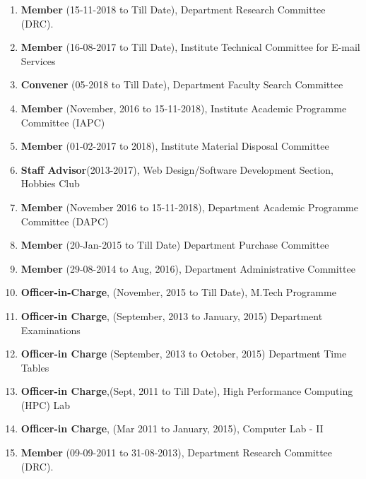 \begin{enumerate}

\item
\textbf{Member} (15-11-2018 to Till Date), Department Research Committee (DRC).

\item
\textbf{Member} (16-08-2017 to Till Date), Institute Technical Committee for E-mail Services

\item
\textbf{Convener} (05-2018 to Till Date), Department Faculty Search Committee

\item
\textbf{Member }(November, 2016 to 15-11-2018), Institute Academic Programme Committee (IAPC)

\item
\textbf{Member} (01-02-2017 to 2018), Institute Material Disposal Committee

\item 
\textbf{Staff Advisor}(2013-2017), Web Design/Software Development Section, Hobbies Club 

\item
\textbf{Member} (November 2016 to 15-11-2018), Department Academic Programme Committee (DAPC)

\item
\textbf{Member} (20-Jan-2015 to Till Date) Department Purchase Committee

\item
\textbf{Member} (29-08-2014 to Aug, 2016), Department Administrative Committee

\item
\textbf{Officer-in-Charge}, (November, 2015 to Till Date), M.Tech Programme

\item
\textbf{Officer-in Charge}, (September, 2013 to January, 2015) Department Examinations

\item
\textbf{Officer-in Charge }(September, 2013 to October, 2015) Department Time Tables

\item
\textbf{Officer-in Charge},(Sept, 2011 to Till Date), High Performance Computing (HPC) Lab 

\item
\textbf{Officer-in Charge}, (Mar 2011 to January, 2015), Computer Lab - II

\item
\textbf{Member} (09-09-2011 to 31-08-2013), Department Research Committee (DRC).


\end{enumerate}
